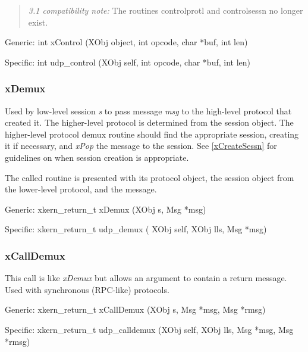 \begin{quote}
{\em 3.1 compatibility note:} The routines controlprotl and controlsessn
no longer exist.
\end{quote}
\medskip

{\sanss Generic:} {\sem int} {\bold xControl} ({\sem XObj} {\caps object}, 
{\sem int} {\caps opcode}, {\sem char} *{\caps buf}, {\sem int} {\caps len})
\medskip

{\sanss Specific:} {\sem int} {\bold udp\_control} ({\sem XObj} {\caps self}, {\sem int} {\caps opcode}, {\sem char} *{\caps buf}, {\sem int} {\caps len})

\subsubsection{xDemux}

\noindent Used by low-level session {\em s} to pass message {\em msg}
to the high-level protocol that created it.  The higher-level protocol
is determined from the session object.  The higher-level protocol
demux routine should find the appropriate session, creating it if
necessary, and {\em xPop} the message to the session. See
\ref{xCreateSessn} for guidelines on when session creation is
appropriate.

The called routine is presented with its protocol object, the session
object from the lower-level protocol, and the message.
\medskip

{\sanss Generic:} {\sem xkern\_return\_t} {\bold xDemux} ({\sem XObj} {\caps s}, {\sem Msg} *{\caps msg})
\medskip

{\sanss Specific:} {\sem xkern\_return\_t} {\bold udp\_demux} ({\sem
XObj} {\caps self}, {\sem XObj} {\caps lls}, {\sem Msg} *{\caps msg})

\subsubsection{xCallDemux}

This call is like {\em xDemux} but allows an argument to contain a
return message. Used with synchronous (RPC-like) protocols.
\medskip

{\sanss Generic:} {\sem xkern\_return\_t} {\bold xCallDemux} ({\sem XObj} {\caps s}, {\sem Msg} *{\caps msg}, {\sem Msg} *{\caps rmsg})
\medskip

{\sanss Specific:} {\sem xkern\_return\_t} {\bold udp\_calldemux}
({\sem XObj} {\caps self}, {\sem XObj} {\caps lls}, {\sem Msg} *{\caps msg}, {\sem Msg} *{\caps rmsg})

